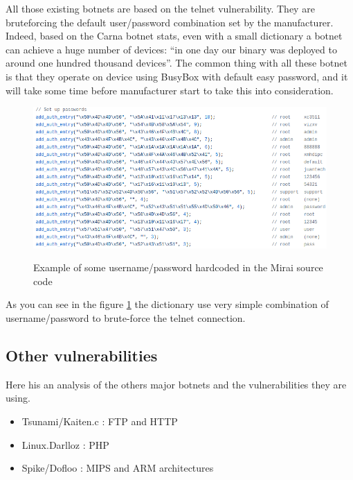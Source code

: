\documentclass{report}
\begin{document}
All those existing botnets are based on the telnet vulnerability. They are bruteforcing the default user/password combination set by the manufacturer. Indeed, based on the Carna botnet \autocite{carna} stats, even with a small dictionary a botnet can achieve a huge number of devices: ``in one day our binary was deployed to around one hundred thousand devices''.
The common thing with all these botnet is that they operate on device using BusyBox with default easy password, and it will take some time before manufacturer start to take this into consideration.\newline
\begin{figure}[h]
 \caption{Example of some username/password hardcoded in the Mirai source code}
 \centering
 \includegraphics[width=1.2\textwidth]{./img/mirai-dict}
 \label{fig:mirai-dict}
\end{figure}
As you can see in the figure \ref{fig:mirai-dict} the dictionary use very simple combination of username/password to brute-force the telnet connection.

\subsection{Other vulnerabilities}
Here his an analysis of the others major botnets and the vulnerabilities they are using.

\begin{itemize}
 \item Tsunami/Kaiten.c \autocite{tsunami} : FTP and HTTP
 \item Linux.Darlloz \autocite{darlloz} : PHP
 \item Spike/Dofloo \autocite{spike} : MIPS and ARM architectures
\end{itemize}
\end{document}
